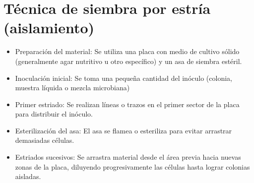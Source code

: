 \documentclass{article}
\begin{document}
\section{Técnica de siembra por estría (aislamiento)}
\begin{itemize}
    \item Preparación del material: Se utiliza una placa con medio de cultivo sólido (generalmente agar nutritivo u otro específico) y un asa de siembra estéril.
    \item Inoculación inicial: Se toma una pequeña cantidad del inóculo (colonia, muestra líquida o mezcla microbiana)
    \item Primer estriado: Se realizan líneas o trazos en el primer sector de la placa para distribuir el inóculo.
    \item Esterilización del asa: El asa se flamea o esteriliza para evitar arrastrar demasiadas células.
    \item Estriados sucesivos: Se arrastra material desde el área previa hacia nuevas zonas de la placa, diluyendo progresivamente las células hasta lograr colonias aisladas.
\end{itemize}
\end{document}
